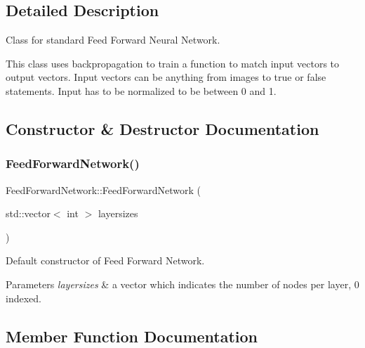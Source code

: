 \subsection{Detailed Description}
Class for standard Feed Forward Neural Network. 

This class uses backpropagation to train a function to match input vectors to output vectors. Input vectors can be anything from images to true or false statements. Input has to be normalized to be between 0 and 1. 

\subsection{Constructor \& Destructor Documentation}
\mbox{\label{classFeedForwardNetwork_a2f714c43ff596c5342aec449644a6709}} 
\subsubsection{\texorpdfstring{Feed\+Forward\+Network()}{FeedForwardNetwork()}}
{\footnotesize\ttfamily Feed\+Forward\+Network\+::\+Feed\+Forward\+Network (\begin{DoxyParamCaption}\item[{std\+::vector$<$ int $>$}]{layersizes }\end{DoxyParamCaption})}



Default constructor of Feed Forward Network. 


\begin{DoxyParams}{Parameters}
{\em layersizes} & a vector which indicates the number of nodes per layer, 0 indexed. \\
\hline
\end{DoxyParams}


\subsection{Member Function Documentation}
\mbox{\label{classFeedForwardNetwork_a369f0c708a65b6eb7cf2b65d439fb5ce}} 
